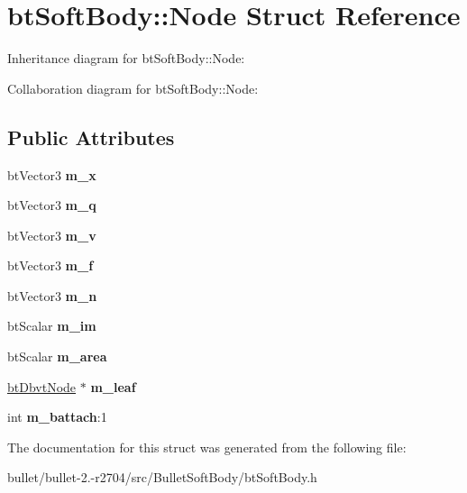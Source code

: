\hypertarget{structbt_soft_body_1_1_node}{\section{bt\+Soft\+Body\+:\+:Node Struct Reference}
\label{structbt_soft_body_1_1_node}
}


Inheritance diagram for bt\+Soft\+Body\+:\+:Node\+:


Collaboration diagram for bt\+Soft\+Body\+:\+:Node\+:
\subsection*{Public Attributes}
\begin{DoxyCompactItemize}
\item 
\hypertarget{structbt_soft_body_1_1_node_a302f526590ac3cd265eccfd3f1cfd817}{bt\+Vector3 {\bfseries m\+\_\+x}}\label{structbt_soft_body_1_1_node_a302f526590ac3cd265eccfd3f1cfd817}

\item 
\hypertarget{structbt_soft_body_1_1_node_ab41394c67b5514c0114c6cb0da2d7bb8}{bt\+Vector3 {\bfseries m\+\_\+q}}\label{structbt_soft_body_1_1_node_ab41394c67b5514c0114c6cb0da2d7bb8}

\item 
\hypertarget{structbt_soft_body_1_1_node_ab286626ebbca7d0ab07fb5bf04232540}{bt\+Vector3 {\bfseries m\+\_\+v}}\label{structbt_soft_body_1_1_node_ab286626ebbca7d0ab07fb5bf04232540}

\item 
\hypertarget{structbt_soft_body_1_1_node_aebe1f784e80e576a11338c21a5717069}{bt\+Vector3 {\bfseries m\+\_\+f}}\label{structbt_soft_body_1_1_node_aebe1f784e80e576a11338c21a5717069}

\item 
\hypertarget{structbt_soft_body_1_1_node_add7c76a258ec17f3856a7b81680b9067}{bt\+Vector3 {\bfseries m\+\_\+n}}\label{structbt_soft_body_1_1_node_add7c76a258ec17f3856a7b81680b9067}

\item 
\hypertarget{structbt_soft_body_1_1_node_a24a6d86c8fb27545c995e3664cf47298}{bt\+Scalar {\bfseries m\+\_\+im}}\label{structbt_soft_body_1_1_node_a24a6d86c8fb27545c995e3664cf47298}

\item 
\hypertarget{structbt_soft_body_1_1_node_a27a52573c1e481488830bcf9f543f16c}{bt\+Scalar {\bfseries m\+\_\+area}}\label{structbt_soft_body_1_1_node_a27a52573c1e481488830bcf9f543f16c}

\item 
\hypertarget{structbt_soft_body_1_1_node_acca6a5b8479e45c00e07b68cdc482f3f}{\hyperlink{structbt_dbvt_node}{bt\+Dbvt\+Node} $\ast$ {\bfseries m\+\_\+leaf}}\label{structbt_soft_body_1_1_node_acca6a5b8479e45c00e07b68cdc482f3f}

\item 
\hypertarget{structbt_soft_body_1_1_node_ab254674b1b0cf75bba85bb59aa98fb69}{int {\bfseries m\+\_\+battach}\+:1}\label{structbt_soft_body_1_1_node_ab254674b1b0cf75bba85bb59aa98fb69}

\end{DoxyCompactItemize}


The documentation for this struct was generated from the following file\+:\begin{DoxyCompactItemize}
\item 
bullet/bullet-\/2.-\/r2704/src/\+Bullet\+Soft\+Body/bt\+Soft\+Body.\+h\end{DoxyCompactItemize}
